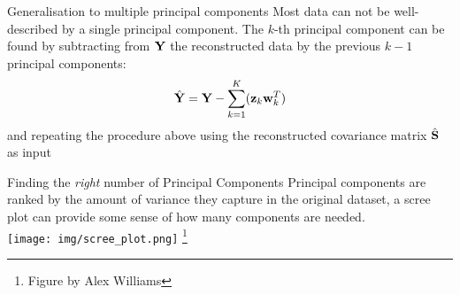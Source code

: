 \documentclass[aspectratio=169,notes]{beamer}
\newcommand\blfootnote[1]{%
  \begingroup
  \renewcommand\thefootnote{}\footnote{#1}%
  \addtocounter{footnote}{-1}%
  \endgroup
}
\begin{document}


	\begin{frame}{Generalisation to multiple principal components}
	Most data can not be well-described by a single principal component. The $k$-th principal component can be found by subtracting from ${\bf Y}$ the reconstructed data by the previous $k-1$ principal components: 
	\[
		\hat{{\bf Y}} = {\bf Y} - \sum_{k=1}^{K} ({\bf z}_k {\bf w}_k^T)
	\]
	and repeating the procedure above using the reconstructed covariance matrix $\hat{{\bf S}}$ as input
	\end{frame}

	\begin{frame}{Finding the \textit{right} number of Principal Components}
	Principal components are ranked by the amount of variance they capture in the original dataset, a scree plot can provide some sense of how many components are needed.\\
	\leavevmode\newline
	\centering
	\texttt{[image: img/scree\_plot.png]}
	\blfootnote{Figure by Alex Williams} %
	\end{frame}



\end{document}
